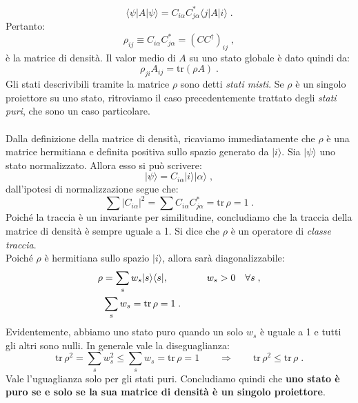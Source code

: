 \documentclass[12pt,a4paper]{report}
\theoremstyle{definition}
\numberwithin{equation}{section}
\newcommand{\bra}{\langle}
\newcommand{\ket}{\rangle}
\newcommand{\adj}[1]{#1^{\dagger}}
\newcommand{\tr}{\mathrm{tr}}
\begin{document}
\begin{equation}
\bra\psi|A|\psi\ket =C_{i\alpha}C_{j\alpha}^*\bra j|A|i\ket\;.
\end{equation}
Pertanto:
\begin{equation}
\rho_{ij}\equiv C_{i\alpha}C_{j\alpha}^*=(C\adj{C})_{ij}\;,
\end{equation}
è la matrice di densità. Il valor medio di $A$ su uno stato globale è dato quindi da:
\begin{equation}
\rho_{ji}A_{ij}=\tr(\rho A)\;.
\end{equation}
Gli stati descrivibili tramite la matrice $\rho$ sono detti \textit{stati misti}. Se $\rho$ è un singolo proiettore su uno stato, ritroviamo il caso precedentemente trattato degli \textit{stati puri}, che sono un caso particolare. \\
\\
Dalla definizione della matrice di densità, ricaviamo immediatamente che $\rho$ è una matrice hermitiana e definita positiva sullo spazio generato da $|i\ket$. Sia $|\psi\ket$ uno stato normalizzato. Allora esso si può scrivere:
\begin{equation}
|\psi\ket=C_{i\alpha}|i\ket|\alpha\ket\;,
\end{equation}
dall'ipotesi di normalizzazione segue che:
\begin{equation}
\sum |C_{i\alpha}|^2=\sum C_{i\alpha}C_{j\alpha}^*=\tr\, \rho =1\;.
\end{equation}
Poiché la traccia è un invariante per similitudine, concludiamo che la traccia della matrice di densità è sempre uguale a 1. Si dice che $\rho$ è un operatore di \textit{classe traccia}. \\
Poiché $\rho$ è hermitiana sullo spazio $|i\ket$, allora sarà diagonalizzabile:
\begin{align}
\rho &= \sum_s w_s|s\ket\bra s|, \qquad \qquad w_s>0\quad \forall s \notag \;,\\
&\sum_s w_s=\tr\, \rho = 1\;.
\end{align}
Evidentemente, abbiamo uno stato puro quando un solo $w_s$ è uguale a 1 e tutti gli altri sono nulli. In generale vale la diseguaglianza:
\begin{equation}
\tr\, \rho^2=\sum_s w_s^2\le \sum_s w_s=\tr\,\rho=1 \qquad \Longrightarrow \qquad \tr\,\rho^2\le \tr\,\rho\;.
\end{equation}
Vale l'uguaglianza solo per gli stati puri. Concludiamo quindi che \textbf{uno stato è puro se e solo se la sua matrice di densità è un singolo proiettore}. \\
\end{document}

